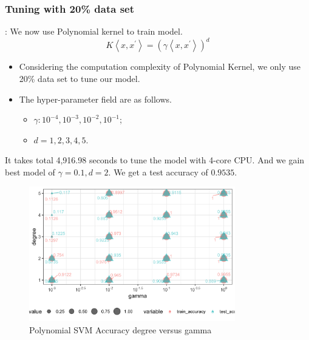 \documentclass[8pt]{beamer}
\begin{document}
\subsubsection{Tuning with 20\% data set}
\begin{frame}[allowframebreaks]{\secname : \subsecname}{\subsubsecname}
We now use Polynomial kernel to train model.
$$
K\left\langle x, x^{\prime}\right\rangle=\left(\gamma\left\langle x, x^{\prime}\right\rangle\right)^{d}
$$	
\begin{itemize}
  \item Considering the computation complexity of Polynomial Kernel, we only use 20\% data set to tune our model. 
  \item The hyper-parameter field are as follows.
	\begin{itemize}
	  \item $\gamma:10^{-4},10^{-3},10^{-2},10^{-1}$;
	  \item $d=1,2,3,4,5$.
	\end{itemize}
\end{itemize}


\framebreak
It takes total 4,916.98 seconds to tune the model with 4-core CPU. And we gain best model of $\gamma=0.1,d=2$. We get a test accuracy of $0.9535$.
\begin{figure}[htbp]
\centerline{\includegraphics[width=0.8\textwidth]{figure/Polynomial SVM Accuracy degree versus gamma.png}}
\caption{Polynomial SVM Accuracy degree versus gamma}
\label{Polynomial SVM Accuracy degree versus gamma}
\vspace{-1.5em}
\end{figure}
\end{frame}
\end{document}
